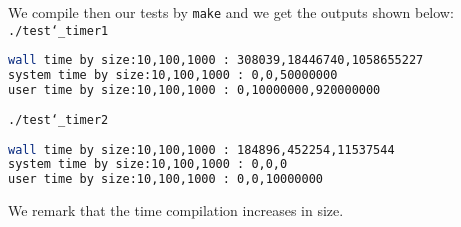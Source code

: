 \documentclass[11pt]{article}
\begin{document}
We compile then our tests by \texttt{make} and we get the outputs shown below:\\
\texttt{./test\char`_timer1}
\begin{lstlisting}[language={sh}]
wall time by size:10,100,1000 : 308039,18446740,1058655227
system time by size:10,100,1000 : 0,0,50000000
user time by size:10,100,1000 : 0,10000000,920000000
\end{lstlisting}
\texttt{./test\char`_timer2}
\begin{lstlisting}[language={sh}]
wall time by size:10,100,1000 : 184896,452254,11537544
system time by size:10,100,1000 : 0,0,0
user time by size:10,100,1000 : 0,0,10000000
\end{lstlisting}

We remark that the time compilation increases in size.
\end{document}
